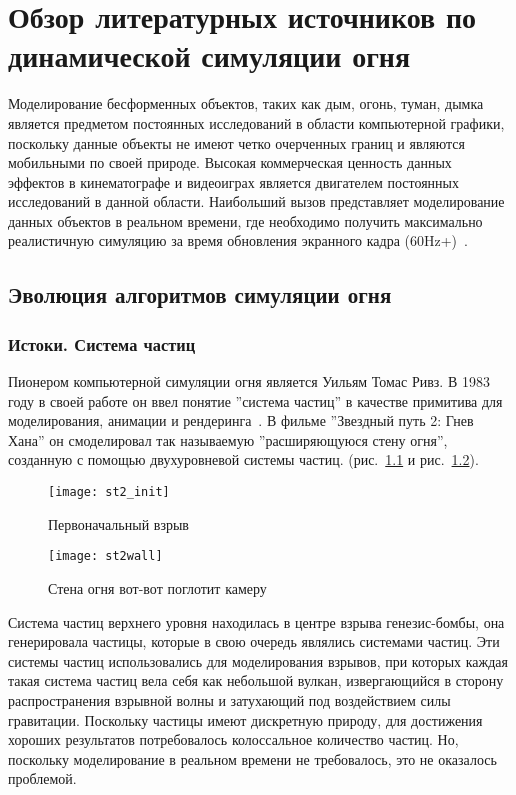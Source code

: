 \chapter{Обзор литературных источников по динамической симуляции огня}

Моделирование бесформенных объектов, таких как дым, огонь, туман, дымка является
предметом постоянных исследований в области компьютерной графики, поскольку
данные объекты не имеют четко очерченных границ и являются мобильными по своей
природе. Высокая коммерческая ценность данных эффектов в кинематографе и
видеоиграх является двигателем постоянных исследований в данной области.
Наибольший вызов представляет моделирование данных объектов в реальном времени,
где необходимо получить максимально реалистичную симуляцию за время обновления
экранного кадра (60Hz+)~\cite{lec17}.

\section{Эволюция алгоритмов симуляции огня}

\subsection{Истоки. Система частиц}

Пионером компьютерной симуляции огня является Уильям Томас Ривз. В 1983 году в
своей работе он ввел понятие ''система частиц'' в качестве примитива для
моделирования, анимации и рендеринга~\cite{reewes1983}. В фильме ''Звездный путь
2: Гнев Хана'' он смоделировал так называемую ''расширяющуюся стену огня'',
созданную с помощью двухуровневой системы частиц.
(рис.~\ref{fig:reeves_1} и рис.~\ref{fig:reeves_2}).
\begin{figure}[htb]
	\centering
	\texttt{[image: st2\_init]}
	\caption{Первоначальный взрыв}%
    \label{fig:reeves_1}
\end{figure}
\begin{figure}[htb]
	\centering
	\texttt{[image: st2wall]}
	\caption{Стена огня вот-вот поглотит камеру}%
    \label{fig:reeves_2}
\end{figure}

Система частиц верхнего уровня находилась в центре взрыва генезис-бомбы, она
генерировала частицы, которые в свою очередь являлись системами частиц. Эти
системы частиц использовались для моделирования взрывов, при которых каждая
такая система частиц вела себя как небольшой вулкан, извергающийся в сторону
распространения взрывной волны и затухающий под воздействием силы гравитации.
Поскольку частицы имеют дискретную природу, для достижения хороших результатов
потребовалось колоссальное количество частиц. Но, поскольку моделирование в
реальном времени не требовалось, это не оказалось проблемой.

